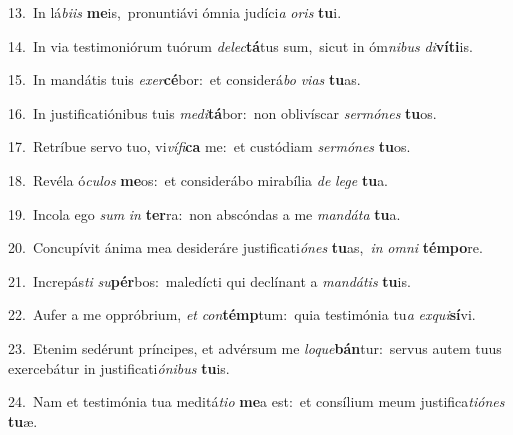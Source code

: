 {\numbfont\textcolor{\numbcolor}{13.}}~In lá\-\textit{bi}\-\textit{is} \textbf{me}\-is,~\star pronuntiávi ómnia judíci\textit{a} \textit{o}\-\textit{ris} \textbf{tu}\-i.\par
{\numbfont\textcolor{\numbcolor}{14.}}~In via testimoniórum tuórum \textit{de}\-\textit{lec}\textbf{tá}tus sum,~\star sicut in óm\-\textit{ni}\-\textit{bus} \textit{di}\-\textbf{ví}\textbf{ti}is.\par
{\numbfont\textcolor{\numbcolor}{15.}}~In mandátis tuis \textit{ex}\-\textit{er}\textbf{cé}bor:~\star et considerá\textit{bo} \textit{vi}\-\textit{as} \textbf{tu}\-as.\par
{\numbfont\textcolor{\numbcolor}{16.}}~In justificatiónibus tuis \textit{me}\-\textit{di}\textbf{tá}bor:~\star non oblivíscar \textit{ser}\-\textit{mó}\textit{nes} \textbf{tu}\-os.\par
{\numbfont\textcolor{\numbcolor}{17.}}~Retríbue servo tuo, vi\-\textit{ví}\-\textit{fi}\textbf{ca} me:~\star et custódiam \textit{ser}\-\textit{mó}\textit{nes} \textbf{tu}\-os.\par
{\numbfont\textcolor{\numbcolor}{18.}}~Revéla ó\-\textit{cu}\-\textit{los} \textbf{me}\-os:~\star et considerábo mirabília \textit{de} \textit{le}\-\textit{ge} \textbf{tu}\-a.\par
{\numbfont\textcolor{\numbcolor}{19.}}~Incola ego \textit{sum} \textit{in} \textbf{ter}\-ra:~\star non abscóndas a me \textit{man}\-\textit{dá}\textit{ta} \textbf{tu}\-a.\par
{\numbfont\textcolor{\numbcolor}{20.}}~Concupívit ánima mea desideráre justificati\-\textit{ó}\-\textit{nes} \textbf{tu}\-as,~\star \textit{in} \textit{om}\-\textit{ni} \textbf{tém}\-\textbf{po}re.\par
{\numbfont\textcolor{\numbcolor}{21.}}~Increpás\textit{ti} \textit{su}\-\textbf{pér}bos:~\star maledícti qui declínant a \textit{man}\-\textit{dá}\textit{tis} \textbf{tu}\-is.\par
{\numbfont\textcolor{\numbcolor}{22.}}~Aufer a me oppróbrium, \textit{et} \textit{con}\-\textbf{témp}tum:~\star quia testimónia tu\textit{a} \textit{ex}\-\textit{qui}\textbf{sí}vi.\par
{\numbfont\textcolor{\numbcolor}{23.}}~Etenim sedérunt príncipes, et advérsum me \textit{lo}\-\textit{que}\textbf{bán}tur:~\star servus autem tuus exercebátur in justificati\-\textit{ó}\-\textit{ni}\textit{bus} \textbf{tu}\-is.\par
{\numbfont\textcolor{\numbcolor}{24.}}~Nam et testimónia tua meditá\-\textit{ti}\-\textit{o} \textbf{me}\-a est:~\star et consílium meum justifica\-\textit{ti}\-\textit{ó}\textit{nes} \textbf{tu}\-æ.\par
